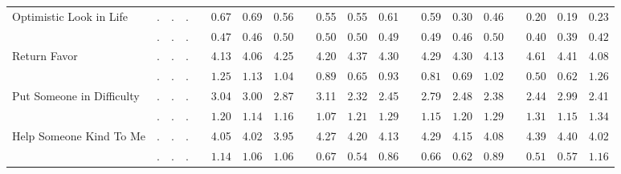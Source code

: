 \begin{center}
{\begin{longtable}{L{5cm} c c c p{.5cm} c c c p{.5cm} c c c p{.5cm} c c c p{.5cm} c c c}
 \quad Optimistic Look in Life & . &         . &         . & &      0.67 &      0.69 &      0.56 & &      0.55 &      0.55 &      0.61 & &      0.59 &      0.30 &      0.46 & &      0.20 &      0.19 &      0.23 \\*
 \quad & $\mathit{        .}$ & $\mathit{        .}$ & $\mathit{        .}$ & & $\mathit{     0.47}$ & $\mathit{     0.46}$ & $\mathit{     0.50}$ & & $\mathit{     0.50}$ & $\mathit{     0.50}$ & $\mathit{     0.49}$ & & $\mathit{     0.49}$ & $\mathit{     0.46}$ & $\mathit{     0.50}$ & & $\mathit{     0.40}$ & $\mathit{     0.39}$ & $\mathit{     0.42}$ \\[.2em]
 \quad Return Favor & . &         . &         . & &      4.13 &      4.06 &      4.25 & &      4.20 &      4.37 &      4.30 & &      4.29 &      4.30 &      4.13 & &      4.61 &      4.41 &      4.08 \\*
 \quad & $\mathit{        .}$ & $\mathit{        .}$ & $\mathit{        .}$ & & $\mathit{     1.25}$ & $\mathit{     1.13}$ & $\mathit{     1.04}$ & & $\mathit{     0.89}$ & $\mathit{     0.65}$ & $\mathit{     0.93}$ & & $\mathit{     0.81}$ & $\mathit{     0.69}$ & $\mathit{     1.02}$ & & $\mathit{     0.50}$ & $\mathit{     0.62}$ & $\mathit{     1.26}$ \\[.2em]
 \quad Put Someone in Difficulty & . &         . &         . & &      3.04 &      3.00 &      2.87 & &      3.11 &      2.32 &      2.45 & &      2.79 &      2.48 &      2.38 & &      2.44 &      2.99 &      2.41 \\*
 \quad & $\mathit{        .}$ & $\mathit{        .}$ & $\mathit{        .}$ & & $\mathit{     1.20}$ & $\mathit{     1.14}$ & $\mathit{     1.16}$ & & $\mathit{     1.07}$ & $\mathit{     1.21}$ & $\mathit{     1.29}$ & & $\mathit{     1.15}$ & $\mathit{     1.20}$ & $\mathit{     1.29}$ & & $\mathit{     1.31}$ & $\mathit{     1.15}$ & $\mathit{     1.34}$ \\[.2em]
 \quad Help Someone Kind To Me & . &         . &         . & &      4.05 &      4.02 &      3.95 & &      4.27 &      4.20 &      4.13 & &      4.29 &      4.15 &      4.08 & &      4.39 &      4.40 &      4.02 \\*
 \quad & $\mathit{        .}$ & $\mathit{        .}$ & $\mathit{        .}$ & & $\mathit{     1.14}$ & $\mathit{     1.06}$ & $\mathit{     1.06}$ & & $\mathit{     0.67}$ & $\mathit{     0.54}$ & $\mathit{     0.86}$ & & $\mathit{     0.66}$ & $\mathit{     0.62}$ & $\mathit{     0.89}$ & & $\mathit{     0.51}$ & $\mathit{     0.57}$ & $\mathit{     1.16}$ \\[.2em]

\end{longtable}}
\end{center}
